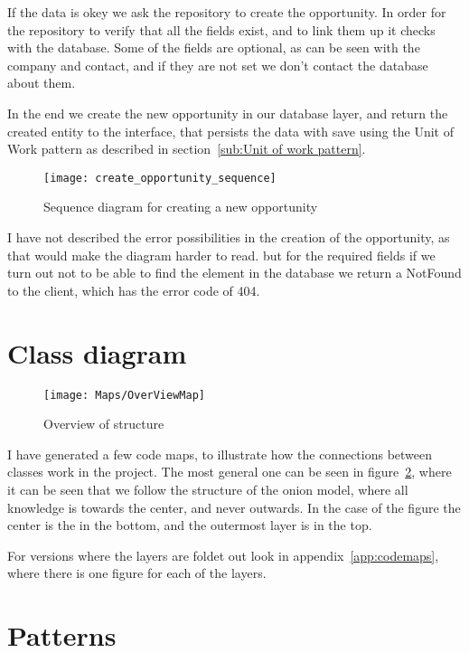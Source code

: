 If the data is okey we ask the repository to create the opportunity. In order
for the repository to verify that all the fields exist, and to link them up it
checks with the database. Some of the fields are optional, as can be seen with
the company and contact, and if they are not set we don't contact the database
about them.

In the end we create the new opportunity in our database layer, and return the
created entity to the interface, that persists the data with save using the Unit
of Work pattern as described in section~\ref{sub:Unit of work pattern}.

\begin{figure}[!htb]
  \centering
  \texttt{[image: create\_opportunity\_sequence]}
  \caption{Sequence diagram for creating a new opportunity}
  \label{fig:opportunity_sequence}
\end{figure}

I have not described the error possibilities in the creation of the opportunity,
as that would make the diagram harder to read. but for the required fields if we
turn out not to be able to find the element in the database we return a NotFound
to the client, which has the error code of 404.

\section{Class diagram}
\label{sec:class_diagram}

\begin{figure}[h]
  \centering
  \texttt{[image: Maps/OverViewMap]}
  \caption{Overview of structure}
  \label{fig:overviewMap}
\end{figure}

I have generated a few code maps, to illustrate how the connections between
classes work in the project. The most general one can be seen in
figure~\ref{fig:overviewMap}, where it can be seen that we follow the structure
of the onion model, where all knowledge is towards the center, and never
outwards. In the case of the figure the center is the in the bottom, and the
outermost layer is in the top.

For versions where the layers are foldet out look in
appendix~\ref{app:codemaps}, where there is one figure for each of the layers.



\section{Patterns}
\label{sec:Patterns}

